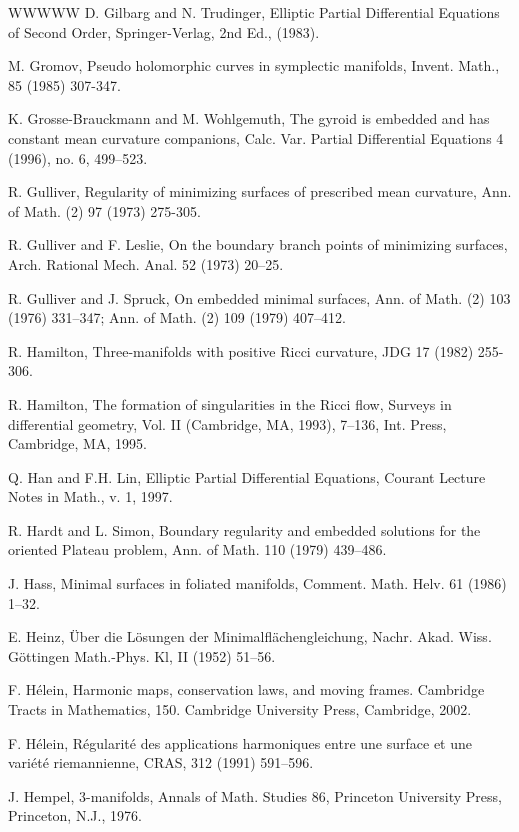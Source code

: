 \begin{thebibliography}{WWWWW}
 D. Gilbarg and N. Trudinger, Elliptic Partial Differential Equations of Second Order, Springer-Verlag, 2nd Ed., (1983).

 M. Gromov, Pseudo holomorphic curves in symplectic manifolds, Invent. Math., 85 (1985) 307-347.

 K. Grosse-Brauckmann and M. Wohlgemuth, The gyroid is embedded and has constant mean curvature companions, Calc. Var. Partial Differential Equations 4 (1996), no. 6, 499–523.

 R. Gulliver, Regularity of minimizing surfaces of prescribed mean curvature, Ann. of Math. (2) 97 (1973) 275-305.

 R. Gulliver and F. Leslie, On the boundary branch points of minimizing surfaces, Arch. Rational Mech. Anal. 52 (1973) 20–25.

 R. Gulliver and J. Spruck, On embedded minimal surfaces, Ann. of Math. (2) 103 (1976) 331–347; Ann. of Math. (2) 109 (1979) 407–412.

 R. Hamilton, Three-manifolds with positive Ricci curvature, JDG 17 (1982) 255-306.

 R. Hamilton, The formation of singularities in the Ricci flow, Surveys in differential geometry, Vol. II (Cambridge, MA, 1993), 7–136, Int. Press, Cambridge, MA, 1995.

 Q. Han and F.H. Lin, Elliptic Partial Differential Equations, Courant Lecture Notes in Math., v. 1, 1997.

 R. Hardt and L. Simon, Boundary regularity and embedded solutions for the oriented Plateau problem, Ann. of Math. 110 (1979) 439–486.

 J. Hass, Minimal surfaces in foliated manifolds, Comment. Math. Helv. 61 (1986) 1–32.

 E. Heinz, Über die Lösungen der Minimalflächengleichung, Nachr. Akad. Wiss. Göttingen Math.-Phys. Kl, II (1952) 51–56.

 F. Hélein, Harmonic maps, conservation laws, and moving frames. Cambridge Tracts in Mathematics, 150. Cambridge University Press, Cambridge, 2002.

 F. Hélein, Régularité des applications harmoniques entre une surface et une variété riemannienne, CRAS, 312 (1991) 591–596.

 J. Hempel, 3-manifolds, Annals of Math. Studies 86, Princeton University Press, Princeton, N.J., 1976.


\end{thebibliography}
